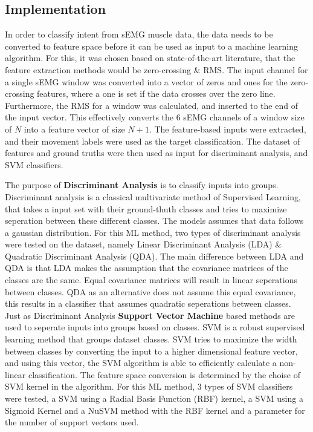 \documentclass[../main.tex]{subfiles}
\begin{document}
\subsection{Implementation}

In order to classify intent from sEMG muscle data, the data needs to be converted to feature space before it can be used as input to a machine learning algorithm.
For this, it was chosen based on state-of-the-art literature, that the feature extraction methods would be zero-crossing \& RMS.
The input channel for a single sEMG window was converted into a vector of zeros and ones for the zero-crossing features, where a one is set if the data crosses over the zero line.
Furthermore, the RMS for a window was calculated, and inserted to the end of the input vector. This effectively converts the 6 sEMG channels of a window size of $N$ into a feature vector of size $N+1$.
The feature-based inputs were extracted, and their movement labels were used as the target classification.
The dataset of features and ground truths were then used as input for discriminant analysis, and SVM classifiers.

The purpose of \textbf{Discriminant Analysis} is to classify inputs into groups.
Discriminant analysis is a classical multivariate method of Supervised Learning, that takes a input set with their ground-thuth classes and tries to maximize seperation between these different classes.
The models assumes that data follows a gaussian distribution. 
For this ML method, two types of discriminant analysis were tested on the dataset, namely
Linear Discriminant Analysis (LDA) \& Quadratic Discriminant Analysis (QDA).
The main difference between LDA and QDA is that LDA makes the assumption that the covariance matrices of the classes are the same.
Equal covariance matrices will result in linear seperations between classes.
QDA as an alternative does not assume this equal covariance, this results in a classifier that assumes quadratic seperations between classes.
Just as Discriminant Analysis \textbf{Support Vector Machine} based methods are used to seperate inputs into groups based on classes.
SVM is a robust supervised learning method that groups dataset classes.
SVM tries to maximize the width between classes by converting the input to a higher dimensional feature vector, and using this vector, the SVM algorithm is able to efficiently calculate a non-linear classification.
The feature space conversion is determined by the choise of SVM kernel in the algorithm.
For this ML method, 3 types of SVM classifiers were tested, a SVM using a Radial Basis Function (RBF) kernel, a SVM using a Sigmoid Kernel and a NuSVM method with the RBF kernel and a parameter for the number of support vectors used.
\end{document}
